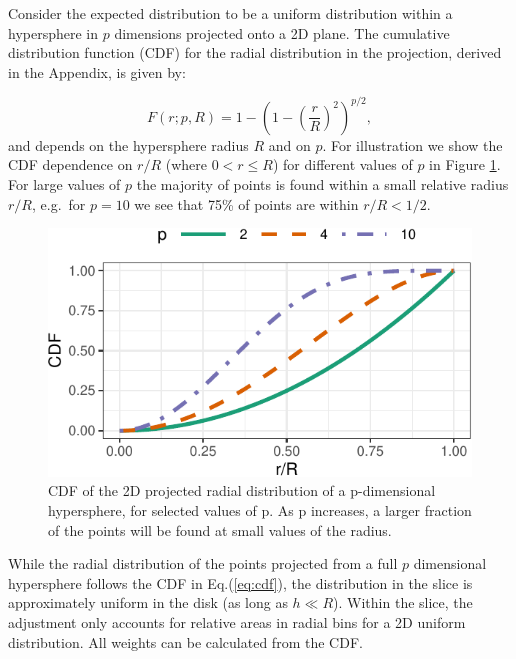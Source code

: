 \documentclass[]{interact}
\theoremstyle{plain}%
\theoremstyle{definition}
\theoremstyle{remark}
\begin{document}
Consider the expected distribution to be a uniform distribution within a
hypersphere in \(p\) dimensions projected onto a 2D plane. The
cumulative distribution function (CDF) for the radial distribution in
the projection, derived in the Appendix, is given by:

\begin{equation}
F(r;p,R) = 1-\left(1-\left(\frac{r}{R}\right)^2\right)^{p/2},
\label{eq:cdf}
\end{equation} and depends on the hypersphere radius \(R\) and on \(p\).
For illustration we show the CDF dependence on \(r/R\) (where
\(0<r\leq R\)) for different values of \(p\) in Figure \ref{fig:cdf}.
For large values of \(p\) the majority of points is found within a small
relative radius \(r/R\), e.g.~for \(p=10\) we see that 75\% of points
are within \(r/R<1/2\).

\begin{figure}

{\centering \includegraphics[width=0.5\linewidth]{section_pursuit_files/figure-latex/cdf-1} 

}

\caption{CDF of the 2D projected radial distribution of a p-dimensional hypersphere, for selected values of p. As p increases, a larger fraction of the points will be found at small values of the radius.}\label{fig:cdf}
\end{figure}

While the radial distribution of the points projected from a full \(p\)
dimensional hypersphere follows the CDF in Eq.(\ref{eq:cdf}), the
distribution in the slice is approximately uniform in the disk (as long
as \(h \ll R\)). Within the slice, the adjustment only accounts for
relative areas in radial bins for a 2D uniform distribution. All weights
can be calculated from the CDF.
\end{document}
